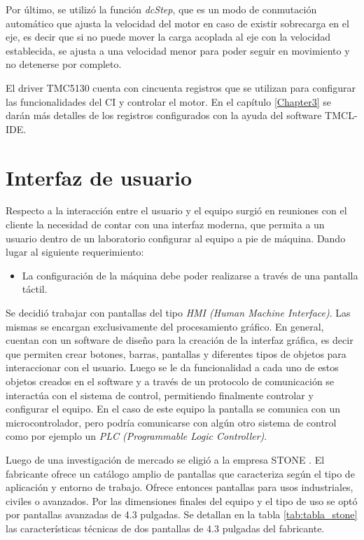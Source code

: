 Por último, se utilizó la función \textit{dcStep}, que es un modo de conmutación automático que ajusta la velocidad del motor en caso de existir sobrecarga en el eje, es decir que si no puede mover la carga acoplada al eje con la velocidad establecida, se ajusta a una velocidad menor para poder seguir en movimiento y no detenerse por completo. 


El driver TMC5130 cuenta con cincuenta registros que se utilizan para configurar las funcionalidades del CI y controlar el motor. En el capítulo \ref{Chapter3} se darán más detalles de los registros configurados con la ayuda del software TMCL-IDE.  


\section{Interfaz de usuario}
\label{sec:interfaz_pantalla}

Respecto a la interacción entre el usuario y el equipo surgió en reuniones con el cliente la necesidad de contar con una interfaz moderna, que permita a un usuario dentro de un laboratorio configurar al equipo a pie de máquina. Dando lugar al siguiente requerimiento:
\begin{itemize}
\item La configuración de la máquina debe poder realizarse a través de una pantalla táctil.	
\end{itemize} 

Se decidió trabajar con pantallas del tipo \textit{HMI (Human Machine Interface)}. Las mismas se encargan exclusivamente del procesamiento gráfico. En general, cuentan con un software de diseño para la creación de la interfaz gráfica, es decir que permiten crear botones, barras, pantallas y diferentes tipos de objetos para interaccionar con el usuario. Luego se le da funcionalidad a cada uno de estos objetos creados en el software y a través de un protocolo de comunicación se interactúa con el sistema de control, permitiendo finalmente controlar y configurar el equipo. En el caso de este equipo la pantalla se comunica con un microcontrolador, pero  podría  comunicarse con algún otro sistema de control como por ejemplo un  \textit{PLC (Programmable Logic Controller)}.
 

Luego de una investigación de mercado se eligió a la empresa STONE \citep{web_stone}. El fabricante ofrece un catálogo amplio de pantallas que caracteriza según el tipo de aplicación y entorno de trabajo. Ofrece entonces pantallas para usos industriales, civiles o avanzados. Por las dimensiones finales del equipo y el tipo de uso se optó por pantallas avanzadas de 4.3 pulgadas. Se detallan en la tabla \ref{tab:tabla_stone} las características técnicas de dos pantallas de 4.3 pulgadas del fabricante.


